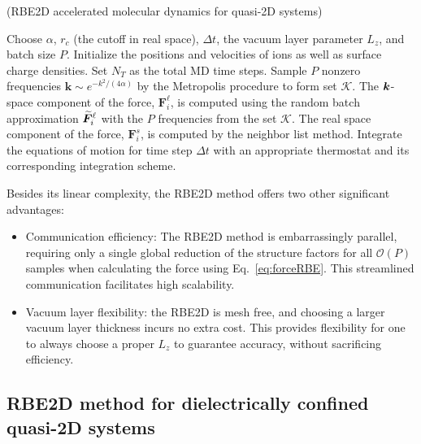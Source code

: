 \begin{algorithm}[ht]
 \caption{(RBE2D accelerated molecular dynamics for quasi-2D systems)}\label{Alg::1}
 \begin{algorithmic}[1]
  \State Choose $\alpha$, $r_c$ (the cutoff in real space), $\Delta t$, the vacuum layer parameter $L_z$, and batch size $P$. Initialize the positions and velocities of ions as well as surface charge densities. Set $N_T$ as the total MD time steps.
  \State Sample $P$ nonzero frequencies $\bm{k}\sim e^{-k^2/(4\alpha)}$ by the Metropolis procedure to form  set $\mathcal{K}$.
  \State The $\boldsymbol{k}$-space component of the force, $\bm{F}_i^{\ell}$, is computed using the random batch approximation $\widetilde{\boldsymbol{F}}_i^{\ell}$ with the $P$ frequencies from the set $\mathcal{K}$.
  \State The real space component of the force, $\bm{F}_i^{s}$, is computed by the neighbor list method. %
  \State Integrate the equations of motion for time step $\Delta t$ with an appropriate thermostat and its corresponding integration scheme. %
  
  \EndFor
 \end{algorithmic}
\end{algorithm}
Besides its linear complexity, the RBE2D method offers two other significant advantages:
\begin{itemize}
    \item  {Communication efficiency: The RBE2D method is embarrassingly parallel, requiring only a single global reduction of the structure factors for all $\mathcal{O}(P)$ samples when calculating the force using Eq.~\eqref{eq:forceRBE}.} This streamlined communication facilitates high scalability. 

    \item Vacuum layer flexibility: the RBE2D is mesh free, and choosing a larger vacuum layer thickness incurs no extra cost. This provides flexibility for one to always choose a proper $L_z$ to guarantee accuracy, without sacrificing efficiency.
\end{itemize}

\subsection{RBE2D method for dielectrically confined quasi-2D systems} \label{subsec::IBCELCDielectric}

